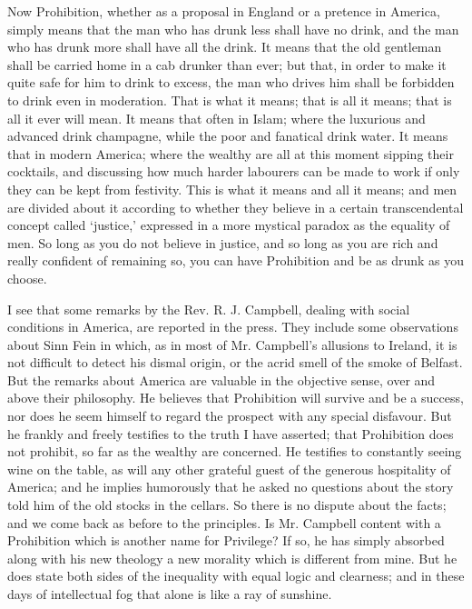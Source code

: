 \documentclass{book}
\begin{document}
Now Prohibition, whether as a proposal in England or a pretence in America, simply means that the man who has drunk less shall have no drink, and the man who has drunk more shall have all the drink. It means that the old gentleman shall be carried home in a cab drunker than ever; but that, in order to make it quite safe for him to drink to excess, the man who drives him shall be forbidden to drink even in moderation. That is what it means; that is all it means; that is all it ever will mean. It means that often in Islam; where the luxurious and advanced drink champagne, while the poor and fanatical drink water. It means that in modern America; where the wealthy are all at this moment sipping their cocktails, and discussing how much harder labourers can be made to work if only they can be kept from festivity. This is what it means and all it means; and men are divided about it according to whether they believe in a certain transcendental concept called ‘justice,’ expressed in a more mystical paradox as the equality of men. So long as you do not believe in justice, and so long as you are rich and really confident of remaining so, you can have Prohibition and be as drunk as you choose.

I see that some remarks by the Rev. R. J. Campbell, dealing with social conditions in America, are reported in the press. They include some observations about Sinn Fein in which, as in most of Mr. Campbell’s allusions to Ireland, it is not difficult to detect his dismal origin, or the acrid smell of the smoke of Belfast. But the remarks about America are valuable in the objective sense, over and above their philosophy. He believes that Prohibition will survive and be a success, nor does he seem himself to regard the prospect with any special disfavour. But he frankly and freely testifies to the truth I have asserted; that Prohibition does not prohibit, so far as the wealthy are concerned. He testifies to constantly seeing wine on the table, as will any other grateful guest of the generous hospitality of America; and he implies humorously that he asked no questions about the story told him of the old stocks in the cellars. So there is no dispute about the facts; and we come back as before to the principles. Is Mr. Campbell content with a Prohibition which is another name for Privilege? If so, he has simply absorbed along with his new theology a new morality which is different from mine. But he does state both sides of the inequality with equal logic and clearness; and in these days of intellectual fog that alone is like a ray of sunshine.
\end{document}
